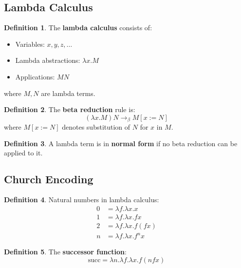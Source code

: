 \documentclass[11pt]{article}
\theoremstyle{definition}
\newtheorem{definition}{Definition}[section]
\begin{document}
\subsection{Lambda Calculus}
\begin{definition}
The \textbf{lambda calculus} consists of:
\begin{itemize}
    \item Variables: $x, y, z, \ldots$
    \item Lambda abstractions: $\lambda x. M$
    \item Applications: $M N$
\end{itemize}
where $M, N$ are lambda terms.
\end{definition}

\begin{definition}
The \textbf{beta reduction} rule is:
$$(\lambda x. M) N \to_\beta M[x := N]$$
where $M[x := N]$ denotes substitution of $N$ for $x$ in $M$.
\end{definition}

\begin{definition}
A lambda term is in \textbf{normal form} if no beta reduction can be applied to it.
\end{definition}

\subsection{Church Encoding}
\begin{definition}
Natural numbers in lambda calculus:
\begin{align}
0 &= \lambda f. \lambda x. x \\
1 &= \lambda f. \lambda x. f x \\
2 &= \lambda f. \lambda x. f(f x) \\
n &= \lambda f. \lambda x. f^n x
\end{align}
\end{definition}

\begin{definition}
The \textbf{successor function}:
$$\text{succ} = \lambda n. \lambda f. \lambda x. f(n f x)$$
\end{definition}
\end{document}
